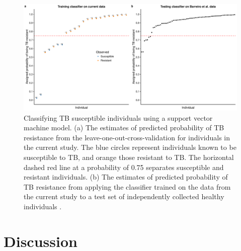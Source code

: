 \documentclass[fleqn,10pt]{wlscirep}
\begin{document}
\begin{figure}[ht]
\centering
\includegraphics[width=\linewidth]{../figure/classifier-svm.pdf}
\caption{
Classifying TB susceptible individuals using a support vector machine
model. (a) The estimates of predicted probability of TB resistance
from the leave-one-out-cross-validation for individuals in the current
study. The blue circles represent individuals known to be susceptible
to TB, and orange those resistant to TB. The horizontal dashed red
line at a probability of 0.75 separates susceptible and resistant
individuals. (b) The estimates of predicted probability of TB
resistance from applying the classifier trained on the data from the
current study to a test set of independently collected healthy
individuals \cite{Barreiro2012}.
}
\label{fig:classifier}
\end{figure}

\section*{Discussion}
\end{document}
